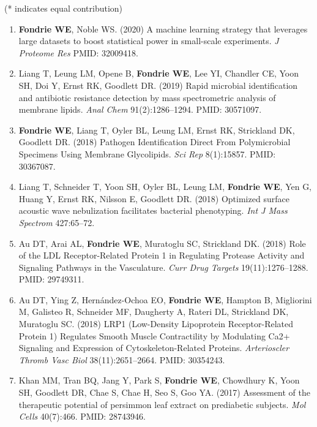 \documentclass{article}
\newcommand{\mysection}[1]{\vspace{1ex}{\bf #1}}
\begin{document}
\mysection{Refereed Publications} (* indicates equal contribution)
\begin{enumerate}
  
  \item \textbf{Fondrie WE}, Noble WS. (2020) A machine learning strategy that
    leverages large datasets to boost statistical power in small-scale
    experiments. \textit{J Proteome Res} PMID: 32009418.
  
  \item Liang T, Leung LM, Opene B, \textbf{Fondrie WE}, Lee YI, Chandler CE,
    Yoon SH, Doi Y, Ernst RK, Goodlett DR. (2019) Rapid microbial identification
    and antibiotic resistance detection by mass spectrometric analysis of
    membrane lipids. \textit{Anal Chem} 91(2):1286--1294. PMID: 30571097.

  \item \textbf{Fondrie WE}, Liang T, Oyler BL, Leung LM, Ernst RK, Strickland
    DK, Goodlett DR. (2018) Pathogen Identification Direct From Polymicrobial
    Specimens Using Membrane Glycolipids. \textit{Sci Rep} 8(1):15857. PMID:
    30367087.
    
  \item Liang T, Schneider T, Yoon SH, Oyler BL, Leung LM, \textbf{Fondrie WE},
    Yen G, Huang Y, Ernst RK, Nilsson E, Goodlett DR. (2018) Optimized surface
    acoustic wave nebulization facilitates bacterial phenotyping. \textit{Int J
      Mass Spectrom} 427:65--72.
    
  \item Au DT, Arai AL, \textbf{Fondrie WE}, Muratoglu SC, Strickland DK. (2018)
    Role of the LDL Receptor-Related Protein 1 in Regulating Protease Activity
    and Signaling Pathways in the Vasculature. \textit{Curr Drug Targets}
    19(11):1276--1288. PMID: 29749311.

  \item Au DT, Ying Z, Hernández-Ochoa EO, \textbf{Fondrie WE}, Hampton B,
    Migliorini M, Galisteo R, Schneider MF, Daugherty A, Rateri DL, Strickland
    DK, Muratoglu SC. (2018) LRP1 (Low-Density Lipoprotein Receptor-Related
    Protein 1) Regulates Smooth Muscle Contractility by Modulating Ca2+
    Signaling and Expression of Cytoskeleton-Related Proteins.
    \textit{Arterioscler Thromb Vasc Biol} 38(11):2651--2664. PMID: 30354243.
    
  \item Khan MM, Tran BQ, Jang Y, Park S, {\bf Fondrie WE}, Chowdhury K, Yoon
    SH, Goodlett DR, Chae S, Chae H, Seo S, Goo YA. (2017) Assessment of the
    therapeutic potential of persimmon leaf extract on prediabetic subjects.
    {\it Mol Cells} 40(7):466. PMID: 28743946.
    

\end{enumerate}
\end{document}
